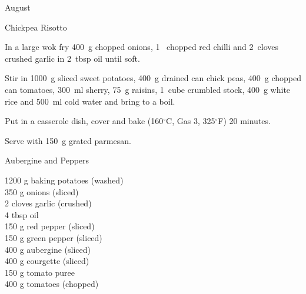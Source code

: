 \begin{menu}{August}
\begin{recipe}{2}{Chickpea Risotto}
\begin{ingredients}
		\end{ingredients}
	
    \begin{instructions}
    \item 
        In a large wok fry
        400~g chopped onions,
        1~ chopped red chilli
        and
        2~cloves crushed garlic
        in
        2~tbsp  oil
        until soft.
      \item 
        Stir in
        1000~g sliced sweet potatoes,
        400~g drained can chick peas,
        400~g chopped can tomatoes,
        300~ml  sherry,
        75~g  raisins,
        1~cube crumbled stock,
        400~g  white rice
        and
        500~ml  cold water
        and bring to a boil.
      \item 
        Put in a
        casserole dish,
        cover and bake (160$^{\circ}$C, Gas 3, 325$^{\circ}$F) 20 minutes.
      \item 
        Serve with
        150~g grated parmesan.
      
    \end{instructions}
    \end{recipe}%
  
    \begin{recipe}{2}{Aubergine and Peppers}%
		\begin{ingredients}
		1200 g baking potatoes (washed) \\
	350 g onions (sliced) \\
	2 cloves garlic (crushed) \\
	4 tbsp oil  \\
	150 g red pepper (sliced) \\
	150 g green pepper (sliced) \\
	400 g aubergine (sliced) \\
	400 g courgette (sliced) \\
	150 g tomato puree  \\
	400 g tomatoes (chopped) \\
	
		\end{ingredients}
	

\end{recipe}
\end{menu}
